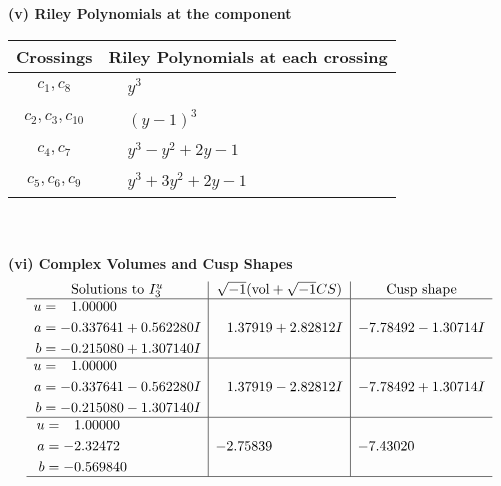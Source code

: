\documentclass[1p]{elsarticle_modified}
\theoremstyle{definition}
\newcommand{\I}{\sqrt{-1}}
\begin{document}
\newpage\renewcommand{\arraystretch}{1}
\flushleft \textbf{(v) Riley Polynomials at the component}\newline \\
\begin{tabular}{m{50pt}|m{274pt}}
Crossings & \hspace{64pt}Riley Polynomials at each crossing \\
\hline $$\begin{aligned}c_{1},c_{8}\end{aligned}$$&$\begin{aligned}
&y^3
\end{aligned}$\\
\hline $$\begin{aligned}c_{2},c_{3},c_{10}\end{aligned}$$&$\begin{aligned}
&(y-1)^3
\end{aligned}$\\
\hline $$\begin{aligned}c_{4},c_{7}\end{aligned}$$&$\begin{aligned}
&y^3- y^2+2 y-1
\end{aligned}$\\
\hline $$\begin{aligned}c_{5},c_{6},c_{9}\end{aligned}$$&$\begin{aligned}
&y^3+3 y^2+2 y-1
\end{aligned}$\\
\hline
\end{tabular}\\~\\
\newpage\flushleft \textbf{(vi) Complex Volumes and Cusp Shapes}
$$\begin{array}{c|c|c}  
\text{Solutions to }I^u_{3}& \I (\text{vol} + \sqrt{-1}CS) & \text{Cusp shape}\\
 \hline 
\begin{aligned}
u &= \phantom{-}1.00000\phantom{ +0.000000I} \\
a &= -0.337641 + 0.562280 I \\
b &= -0.215080 + 1.307140 I\end{aligned}
 & \phantom{-}1.37919 + 2.82812 I & -7.78492 - 1.30714 I \\ \hline\begin{aligned}
u &= \phantom{-}1.00000\phantom{ +0.000000I} \\
a &= -0.337641 - 0.562280 I \\
b &= -0.215080 - 1.307140 I\end{aligned}
 & \phantom{-}1.37919 - 2.82812 I & -7.78492 + 1.30714 I \\ \hline\begin{aligned}
u &= \phantom{-}1.00000\phantom{ +0.000000I} \\
a &= -2.32472\phantom{ +0.000000I} \\
b &= -0.569840\phantom{ +0.000000I}\end{aligned}
 & -2.75839\phantom{ +0.000000I} & -7.43020\phantom{ +0.000000I}\\
 \hline 
 \end{array}$$\newpage\newpage\renewcommand{\arraystretch}{1}
\end{document}

